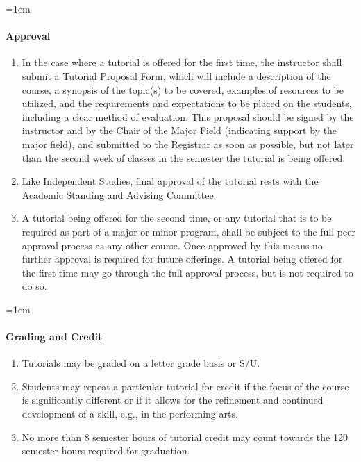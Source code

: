 \documentclass{manual}
\let\oldparagraph\paragraph
\renewcommand\paragraph{\leftskip=1em\oldparagraph}
\newcommand{\itemLevelA}{\alph*.}
\newcommand{\itemRefA}{\alph*}
\begin{document}
\paragraph{Approval }
\begin{enumerate}[label=\itemLevelA,ref=\itemRefA]
\item In the case where a tutorial is offered for the first time, the instructor shall submit a Tutorial Proposal Form, which will include a description of the course, a synopsis of the topic(s) to be covered, examples of resources to be utilized, and the requirements and expectations to be placed on the students, including a clear method of evaluation.  This proposal should be signed by the instructor and by the Chair of the Major Field (indicating support by the major field), and submitted to the Registrar as soon as possible, but not later than the second week of classes in the semester the tutorial is being offered.  

\item Like Independent Studies, final approval of the tutorial rests with the Academic Standing and Advising Committee.

\item A tutorial being offered for the second time, or any tutorial that is to be required as part of a major or minor program, shall be subject to the full peer approval process as any other course.  Once approved by this means no further approval is required for future offerings.  A tutorial being offered for the first time may go through the full approval process, but is not required to do so.
\end{enumerate}

\paragraph{Grading and Credit}
\begin{enumerate}[label=\itemLevelA,ref=\itemRefA]
\item Tutorials may be graded on a letter grade basis or S/U.

\item Students may repeat a particular tutorial for credit if the focus of the course is significantly different or if it allows for the refinement and continued development of a skill, e.g., in the performing arts.  

\item No more than 8 semester hours of tutorial credit may count towards the 120 semester hours required for graduation.
\end{enumerate}
\end{document}
